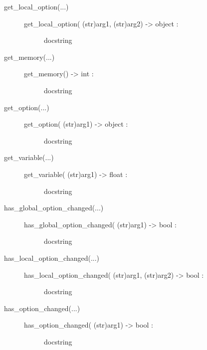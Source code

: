 \documentclass[letterpaper,10pt,english]{sphinxmanual}
\begin{document}
\begin{description}
\begin{description}
\begin{description}
\end{description}

\item[{get\_local\_option(...)}] \leavevmode\begin{description}
\item[{get\_local\_option( (str)arg1, (str)arg2) -\textgreater{} object :}] \leavevmode
docstring

\end{description}

\item[{get\_memory(...)}] \leavevmode\begin{description}
\item[{get\_memory() -\textgreater{} int :}] \leavevmode
docstring

\end{description}

\item[{get\_option(...)}] \leavevmode\begin{description}
\item[{get\_option( (str)arg1) -\textgreater{} object :}] \leavevmode
docstring

\end{description}

\item[{get\_variable(...)}] \leavevmode\begin{description}
\item[{get\_variable( (str)arg1) -\textgreater{} float :}] \leavevmode
docstring

\end{description}

\item[{has\_global\_option\_changed(...)}] \leavevmode\begin{description}
\item[{has\_global\_option\_changed( (str)arg1) -\textgreater{} bool :}] \leavevmode
docstring

\end{description}

\item[{has\_local\_option\_changed(...)}] \leavevmode\begin{description}
\item[{has\_local\_option\_changed( (str)arg1, (str)arg2) -\textgreater{} bool :}] \leavevmode
docstring

\end{description}

\item[{has\_option\_changed(...)}] \leavevmode\begin{description}
\item[{has\_option\_changed( (str)arg1) -\textgreater{} bool :}] \leavevmode
docstring


\end{description}
\end{description}
\end{description}
\end{document}
